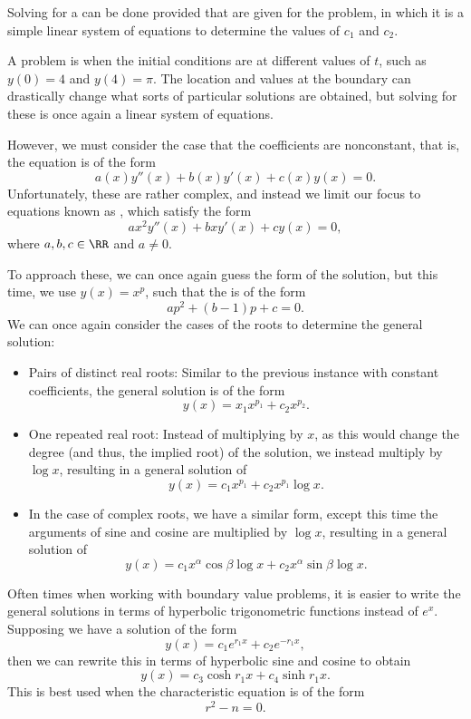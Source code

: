 Solving for a  can be done provided that  are given for the problem, in which it is a simple linear system of equations to determine the values of $c_1$ and  $c_2$. 

A  problem is when the initial conditions are at different values of $t$, such as $y(0) = 4$ and $y(4) = \pi$. The location and values at the boundary can drastically change what sorts of particular solutions are obtained, but solving for these is once again a linear system of equations. 

However, we must consider the case that the coefficients are nonconstant, that is, the equation is of the form 
\[ a(x)y''(x) + b(x)y'(x) + c(x)y(x) = 0. \] Unfortunately, these are rather complex, and instead we limit our focus to equations known as , which satisfy the form 
\[ ax^2y''(x) + bxy'(x) + cy(x) = 0, \] where $a,b,c \in \RR$ and $a \neq 0$. 

To approach these, we can once again guess the form of the solution, but this time, we use $y(x) = x^p$, such that the  is of the form 
\[ ap^2 + (b-1)p + c = 0. \] We can once again consider the cases of the roots to determine the general solution: 
\begin{itemize}
\item Pairs of distinct real roots: Similar to the previous instance with constant coefficients, the general solution is of the form 
\[ y(x) = x_1x^{p_1} + c_2x^{p_2}. \] 
\item One repeated real root: Instead of multiplying by $x$, as this would change the degree (and thus, the implied root) of the solution, we instead multiply by $\log{x}$, resulting in a general solution of 
\[ y(x) = c_1x^{p_1} + c_2x^{p_1}\log{x}. \] 
\item In the case of complex roots, we have a similar form, except this time the arguments of sine and cosine are multiplied by $\log{x}$, resulting in a general solution of 
\[ y(x) = c_1x^\alpha\cos{\beta \log{x}} + c_2x^\alpha \sin{\beta \log{x}}. \] 
\end{itemize}

Often times when working with boundary value problems, it is easier to write the general solutions in terms of hyperbolic trigonometric functions instead of $e^x$. Supposing we have a solution of the form 
\[ y(x) = c_1e^{r_1 x} + c_2e^{-r_1 x}, \] then we can rewrite this in terms of hyperbolic sine and cosine to obtain 
\[ y(x)  = c_3\cosh{r_1x} + c_4\sinh{r_1x}. \] This is best used when the characteristic equation is of the form 
\[ r^2 - n = 0. \] 

